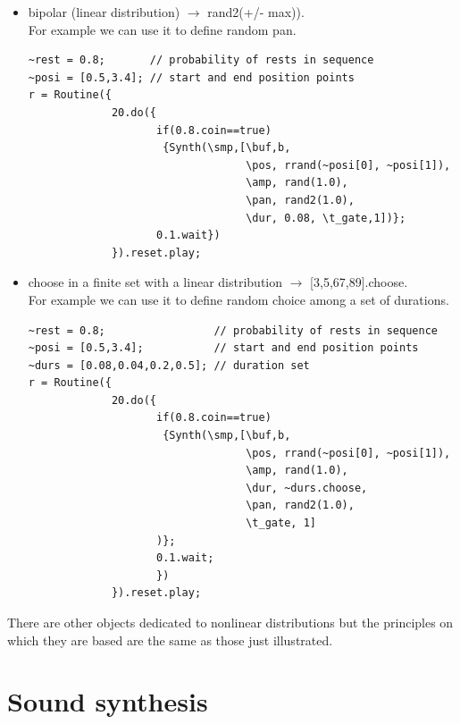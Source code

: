 \begin{itemize}
\item bipolar (linear distribution) \(\rightarrow\) rand2(+/- max)). \\
For example we can use it to define random pan.

\begin{lstlisting}[frame=single, caption=rand2(+/-max)] 
~rest = 0.8;       // probability of rests in sequence
~posi = [0.5,3.4]; // start and end position points
r = Routine({
             20.do({
                    if(0.8.coin==true) 
                     {Synth(\smp,[\buf,b, 
                                  \pos, rrand(~posi[0], ~posi[1]), 
                                  \amp, rand(1.0),
                                  \pan, rand2(1.0),
                                  \dur, 0.08, \t_gate,1])};
                    0.1.wait})
             }).reset.play;
\end{lstlisting}

\item choose in a finite set with a linear distribution \(\rightarrow\)
  {[}3,5,67,89{]}.choose. \\
  For example we can use it to define random choice among a set of durations.

\begin{lstlisting}[frame=single, caption=choose(Array)] 
~rest = 0.8;                 // probability of rests in sequence
~posi = [0.5,3.4];           // start and end position points
~durs = [0.08,0.04,0.2,0.5]; // duration set
r = Routine({
             20.do({
                    if(0.8.coin==true) 
                     {Synth(\smp,[\buf,b, 
                                  \pos, rrand(~posi[0], ~posi[1]),
                                  \amp, rand(1.0),
                                  \dur, ~durs.choose,
                                  \pan, rand2(1.0),
                                  \t_gate, 1]
                    )};
                    0.1.wait;
                    })
             }).reset.play;
\end{lstlisting}
\end{itemize}

There are other objects dedicated to nonlinear distributions but the principles on which they are based are the same as those just illustrated.

\section{Sound synthesis}\label{sound-synthesis}

